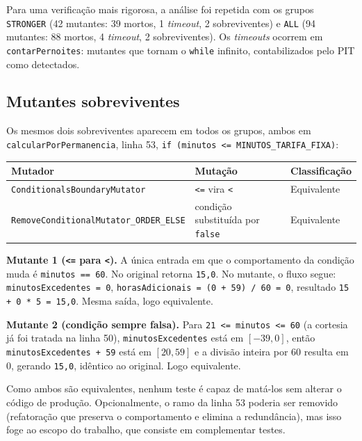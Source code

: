 \documentclass[11pt,a4paper]{article}
\begin{document}
Para uma verificação mais rigorosa, a análise foi repetida com os grupos
\texttt{STRONGER} (42 mutantes: 39 mortos, 1 \emph{timeout}, 2 sobreviventes) e
\texttt{ALL} (94 mutantes: 88 mortos, 4 \emph{timeout}, 2 sobreviventes). Os
\emph{timeouts} ocorrem em \texttt{contarPernoites}: mutantes que tornam o
\texttt{while} infinito, contabilizados pelo PIT como detectados.

\subsection{Mutantes sobreviventes}

Os mesmos dois sobreviventes aparecem em todos os grupos, ambos em
\texttt{calcularPorPermanencia}, linha 53, \texttt{if (minutos <= MINUTOS\_TARIFA\_FIXA)}:

\begin{center}
\small
\begin{tabular}{@{}p{6.6cm} p{4.6cm} p{2.6cm}@{}}
\toprule
Mutador & Mutação & Classificação \\
\midrule
\texttt{ConditionalsBoundaryMutator} & \texttt{<=} vira \texttt{<} & Equivalente \\
\texttt{RemoveConditionalMutator\_ORDER\_ELSE} & condição substituída por \texttt{false} & Equivalente \\
\bottomrule
\end{tabular}
\end{center}

\textbf{Mutante 1 (\texttt{<=} para \texttt{<}).} A única entrada em que o
comportamento da condição muda é \texttt{minutos == 60}. No original retorna
\texttt{15,0}. No mutante, o fluxo segue: \texttt{minutosExcedentes = 0},
\texttt{horasAdicionais = (0 + 59) / 60 = 0}, resultado \texttt{15 + 0 * 5 = 15,0}.
Mesma saída, logo equivalente.

\textbf{Mutante 2 (condição sempre falsa).} Para \texttt{21 <= minutos <= 60}
(a cortesia já foi tratada na linha 50), \texttt{minutosExcedentes} está em
$[-39, 0]$, então \texttt{minutosExcedentes + 59} está em $[20, 59]$ e a divisão
inteira por 60 resulta em 0, gerando \texttt{15,0}, idêntico ao original. Logo
equivalente.

Como ambos são equivalentes, nenhum teste é capaz de matá-los sem alterar o
código de produção. Opcionalmente, o ramo da linha 53 poderia ser removido
(refatoração que preserva o comportamento e elimina a redundância), mas isso foge
ao escopo do trabalho, que consiste em complementar testes.
\end{document}
